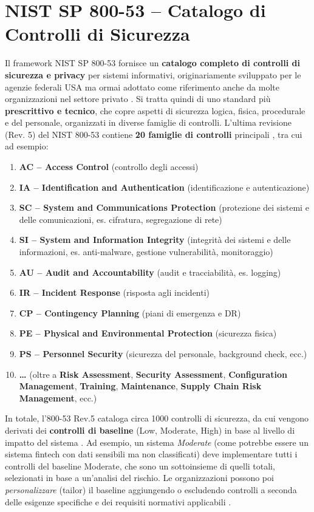 \documentclass[a4paper,12pt]{report}
\begin{document}
\section{NIST SP 800-53 – Catalogo di Controlli di Sicurezza}
\label{sec:nist_sp_800_53}
Il framework NIST SP 800-53 fornisce un \textbf{catalogo completo di controlli di sicurezza e privacy} per sistemi informativi, originariamente sviluppato per le agenzie federali USA ma ormai adottato come riferimento anche da molte organizzazioni nel settore privato \cite{hyperproofNist}. Si tratta quindi di uno standard più \textbf{prescrittivo e tecnico}, che copre aspetti di sicurezza logica, fisica, procedurale e del personale, organizzati in diverse famiglie di controlli. L’ultima revisione (Rev. 5) del NIST 800-53 contiene \textbf{20 famiglie di controlli} principali \cite{hyperproofNist,hyperproofNist}, tra cui ad esempio:
\begin{enumerate}
    \item \textbf{AC – Access Control} (controllo degli accessi)
    \item \textbf{IA – Identification and Authentication} (identificazione e autenticazione)
    \item \textbf{SC – System and Communications Protection} (protezione dei sistemi e delle comunicazioni, es. cifratura, segregazione di rete)
    \item \textbf{SI – System and Information Integrity} (integrità dei sistemi e delle informazioni, es. anti-malware, gestione vulnerabilità, monitoraggio)
    \item \textbf{AU – Audit and Accountability} (audit e tracciabilità, es. logging)
    \item \textbf{IR – Incident Response} (risposta agli incidenti)
    \item \textbf{CP – Contingency Planning} (piani di emergenza e DR)
    \item \textbf{PE – Physical and Environmental Protection} (sicurezza fisica)
    \item \textbf{PS – Personnel Security} (sicurezza del personale, background check, ecc.)
    \item \textbf{…} (oltre a \textbf{Risk Assessment}, \textbf{Security Assessment}, \textbf{Configuration Management}, \textbf{Training}, \textbf{Maintenance}, \textbf{Supply Chain Risk Management}, ecc.)
\end{enumerate}

In totale, l’800-53 Rev.5 cataloga circa 1000 controlli di sicurezza, da cui vengono derivati dei \textbf{controlli di baseline} (Low, Moderate, High) in base al livello di impatto del sistema \cite{hyperproofNist}. Ad esempio, un sistema \textit{Moderate} (come potrebbe essere un sistema fintech con dati sensibili ma non classificati) deve implementare tutti i controlli del baseline Moderate, che sono un sottoinsieme di quelli totali, selezionati in base a un’analisi del rischio. Le organizzazioni possono poi \textit{personalizzare} (tailor) il baseline aggiungendo o escludendo controlli a seconda delle esigenze specifiche e dei requisiti normativi applicabili \cite{hyperproofNist}.
\end{document}
